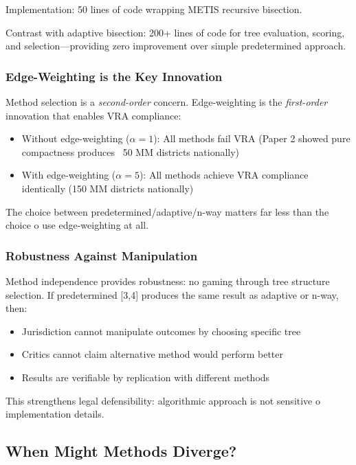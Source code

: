 Implementation: 50 lines of code wrapping METIS recursive bisection.

Contrast with adaptive bisection: 200+ lines of code for tree evaluation, scoring, and selection—providing zero improvement over simple predetermined approach.

\subsubsection{Edge-Weighting is the Key Innovation}

Method selection is a \textit{second-order} concern. Edge-weighting is the \textit{first-order} innovation that enables VRA compliance:
\begin{itemize}
\item Without edge-weighting ($\alpha = 1$): All methods fail VRA (Paper 2 showed pure compactness produces ~50 MM districts nationally)
\item With edge-weighting ($\alpha = 5$): All methods achieve VRA compliance identically (150 MM districts nationally)
\end{itemize}

The choice between predetermined/adaptive/n-way matters far less than the choice 	o use edge-weighting at all.

\subsubsection{Robustness Against Manipulation}

Method independence provides robustness: no gaming through tree structure selection. If predetermined [3,4] produces the same result as adaptive or n-way, then:
\begin{itemize}
\item Jurisdiction cannot manipulate outcomes by choosing specific tree
\item Critics cannot claim alternative method would perform better
\item Results are verifiable by replication with different methods
\end{itemize}

This strengthens legal defensibility: algorithmic approach is not sensitive 	o implementation details.

\subsection{When Might Methods Diverge?}

